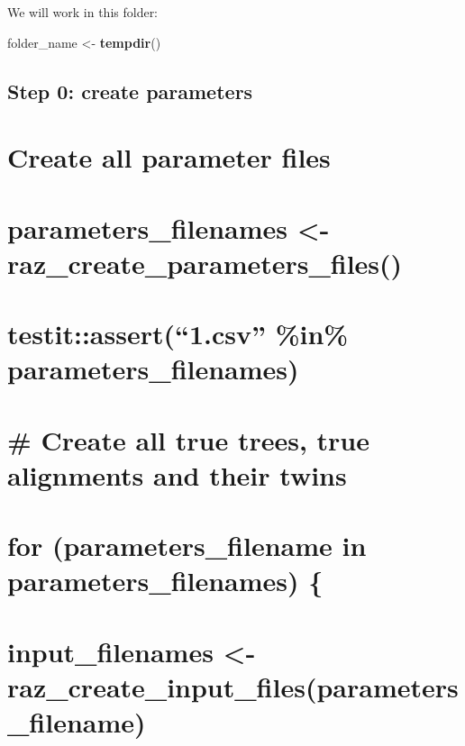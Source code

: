 \documentclass[]{article}
\newenvironment{Shaded}{\begin{snugshade}}{\end{snugshade}}
\newcommand{\KeywordTok}[1]{\textcolor[rgb]{0.13,0.29,0.53}{\textbf{#1}}}
\newcommand{\StringTok}[1]{\textcolor[rgb]{0.31,0.60,0.02}{#1}}
\newcommand{\NormalTok}[1]{#1}
\begin{document}
We will work in this folder:

\begin{Shaded}
\begin{Highlighting}[]
\NormalTok{folder_name <-}\StringTok{ }\KeywordTok{tempdir}\NormalTok{()}
\end{Highlighting}
\end{Shaded}

\subsection{Step 0: create parameters}\label{step-0-create-parameters}

\section{Create all parameter files}\label{create-all-parameter-files}

\section{parameters\_filenames \textless{}-
raz\_create\_parameters\_files()}\label{parameters_filenames---raz_create_parameters_files}

\section{\texorpdfstring{testit::assert(``1.csv'' \%in\%
parameters\_filenames)}{testit::assert(1.csv \%in\% parameters\_filenames)}}\label{testitassert1.csv-in-parameters_filenames}

\section{}\label{section}

\section{\# Create all true trees, true alignments and their
twins}\label{create-all-true-trees-true-alignments-and-their-twins}

\section{for (parameters\_filename in parameters\_filenames)
\{}\label{for-parameters_filename-in-parameters_filenames}

\section{input\_filenames \textless{}-
raz\_create\_input\_files(parameters\_filename)}\label{input_filenames---raz_create_input_filesparameters_filename}
\end{document}
